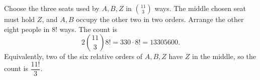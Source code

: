 Choose the three seats used by $A,B,Z$ in $\binom{11}{3}$ ways. The middle chosen seat must hold $Z$, and $A,B$ occupy the other two in two orders. Arrange the other eight people in $8!$ ways. The count is
\[2\binom{11}{3}8!=330\cdot8!=\boxed{13305600}.\]
Equivalently, two of the six relative orders of $A,B,Z$ have $Z$ in the middle, so the count is $\dfrac{11!}{3}$.
